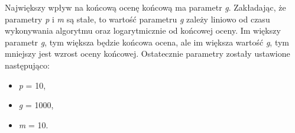 Największy wpływ na końcową ocenę końcową ma parametr \textit{g}. Zakładając, że parametry \textit{p} i \textit{m} są stałe, to wartość parametru \textit{g} zależy liniowo od czasu wykonywania algorytmu oraz logarytmicznie od końcowej oceny. Im większy parametr \textit{g}, tym większa będzie końcowa ocena, ale im większa wartość \textit{g}, tym mniejszy jest wzrost oceny końcowej. Ostatecznie parametry zostały ustawione następująco:
\begin{itemize}
	\item \textit{p} = 10,
	\item \textit{g} = 1000,
	\item \textit{m} = 10.
\end{itemize}